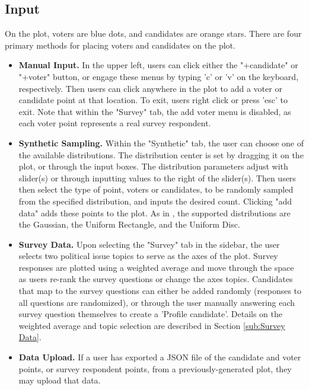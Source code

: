 \subsection{Input}%
\label{sub:Input}
On the plot, voters are blue dots, and candidates are orange stars.
There are four primary methods for placing voters and candidates on the plot.
\begin{itemize}
  \item \textbf{Manual Input.}
    In the upper left, users can click either the "+candidate" or "+voter" button, or engage these menus
    by typing 'c' or 'v' on the keyboard, respectively. Then users can click anywhere in the 
    plot to add a voter or candidate point at that location. To exit, users right click or press 'esc' to exit.
    Note that within the "Survey" tab, the add voter menu is disabled, as each voter point represents a real survey respondent.

  \item \textbf{Synthetic Sampling.}
    Within the "Synthetic" tab, the user can choose one of the available distributions.
    The distribution center is set by dragging it on the plot, or through the input boxes.
    The distribution parameters adjust with slider(s) or through inputting values to the right of the slider(s).
    Then users then select the type of point, voters or candidates, to be randomly sampled from the specified distribution, 
    and inputs the desired count. Clicking "add data" adds these points to the plot.
    As in \cite{elkind}, the supported distributions are
    the Gaussian, the Uniform Rectangle, and the Uniform Disc.

  \item \textbf{Survey Data.}
    Upon selecting the "Survey" tab in the sidebar, the user selects two political issue topics to serve as the axes 
    of the plot. Survey responses are plotted using a weighted average and move through the space as users re-rank the survey questions or change the axes topics.
    Candidates that map to the survey questions can either be added randomly (responses to all questions are randomized), or through the user manually answering each
    survey question themselves to create a 'Profile candidate'.
    Details on the weighted average and topic selection are described in Section \ref{sub:Survey Data}.

  \item \textbf{Data Upload.}
    If a user has exported a JSON file of the candidate and voter points,
    or survey respondent points, from a previously-generated plot,
    they may upload that data.

\end{itemize}


